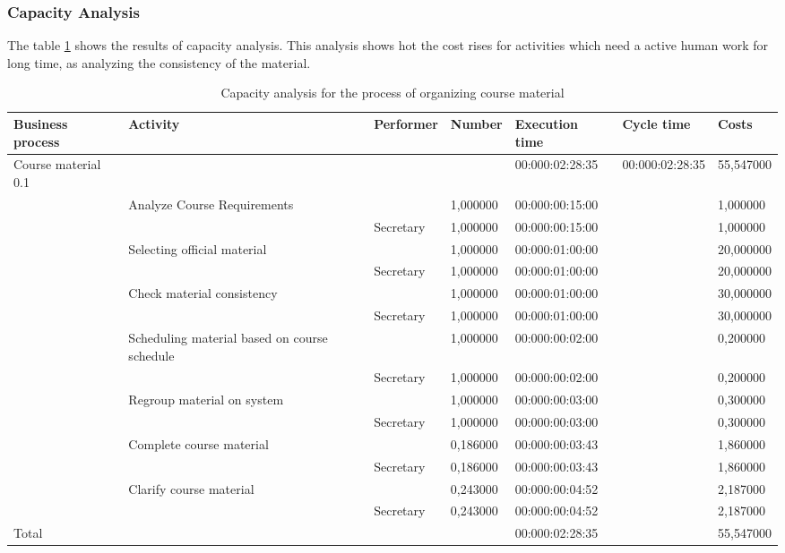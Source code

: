 \subsubsection{Capacity Analysis}
The table \ref{2tab:material} shows the results of capacity analysis.
This analysis shows hot the cost rises for activities which need a active
human work for long time, as analyzing the consistency of the material.

\begin{landscape}
\centering
\begin{table}
{\tiny
\begin{tabular}{|l|l|l|l|l|l|l|}
Business process&Activity&Performer&Number&Execution time&Cycle
time&Costs\\
\hline
Course material 0.1&&&&00:000:02:28:35&00:000:02:28:35&55,547000\\
\hline
&Analyze Course Requirements &&1,000000&00:000:00:15:00&&1,000000\\
\hline
&&Secretary &1,000000&00:000:00:15:00&&1,000000\\
\hline
&Selecting official material &&1,000000&00:000:01:00:00&&20,000000\\
\hline
&&Secretary &1,000000&00:000:01:00:00&&20,000000\\
\hline
&Check material consistency &&1,000000&00:000:01:00:00&&30,000000\\
\hline
&&Secretary &1,000000&00:000:01:00:00&&30,000000\\
\hline
&Scheduling material based on course schedule &&1,000000&00:000:00:02:00&&0,200000\\
\hline
&&Secretary &1,000000&00:000:00:02:00&&0,200000\\
\hline
&Regroup material on system &&1,000000&00:000:00:03:00&&0,300000\\
\hline
&&Secretary &1,000000&00:000:00:03:00&&0,300000\\
\hline
&Complete course material &&0,186000&00:000:00:03:43&&1,860000\\
\hline
&&Secretary &0,186000&00:000:00:03:43&&1,860000\\
\hline
&Clarify course material &&0,243000&00:000:00:04:52&&2,187000\\
\hline
&&Secretary &0,243000&00:000:00:04:52&&2,187000\\
\hline
Total&&&&00:000:02:28:35&&55,547000\\
\hline
\end{tabular}
}
\caption{Capacity analysis for the process of organizing course material} 
\label{2tab:material}
\end{table}
\end{landscape}




